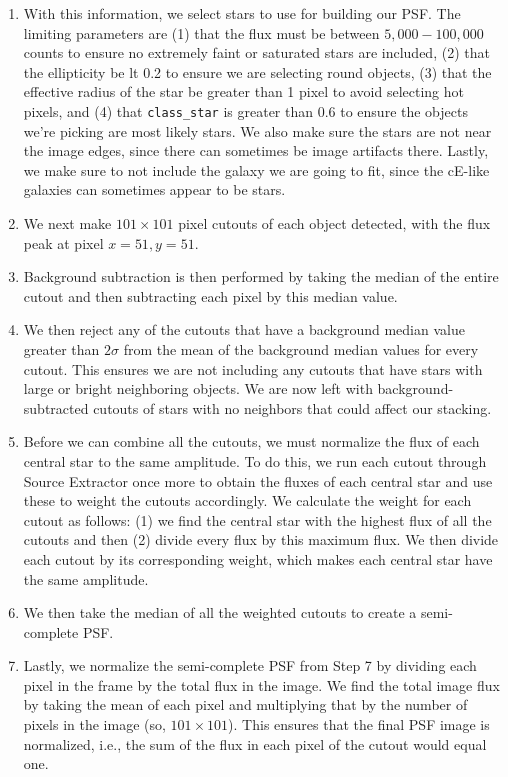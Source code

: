 \documentclass[iop,apj]{emulateapj}
\begin{document}
\begin{description}
{\begin{enumerate}
\item With this information, we select stars to use for building our PSF. The limiting parameters are (1) that the flux must be between $5,000-100,000$ counts to ensure no extremely faint or saturated stars are included, (2) that the ellipticity be lt 0.2 to ensure we are selecting round objects, (3) that the effective radius of the star be greater than 1 pixel to avoid selecting hot pixels, and (4) that \texttt{class\_star} is greater than 0.6 to ensure the objects we're picking are most likely stars. We also make sure the stars are not near the image edges, since there can sometimes be image artifacts there. Lastly, we make sure to not include the galaxy we are going to fit, since the cE-like galaxies can sometimes appear to be stars.

\item We next make $101\times101$ pixel cutouts of each object detected, with the flux peak at pixel $x=51,y=51$. 

\item Background subtraction is then performed by taking the median of the entire cutout and then subtracting each pixel by this median value.

\item We then reject any of the cutouts that have a background median value greater than $2\sigma$ from the mean of the background median values for every cutout. This ensures we are not including any cutouts that have stars with large or bright neighboring objects. We are now left with background-subtracted cutouts of stars with no neighbors that could affect our stacking. 

\item Before we can combine all the cutouts, we must normalize the flux of each central star to the same amplitude. To do this, we run each cutout through Source Extractor once more to obtain the fluxes of each central star and use these to weight the cutouts accordingly. We calculate the weight for each cutout as follows: (1) we find the central star with the highest flux of all the cutouts and then (2) divide every flux by this maximum flux. We then divide each cutout by its corresponding weight, which makes each central star have the same amplitude.

\item We then take the median of all the weighted cutouts to create a semi-complete PSF.

\item Lastly, we normalize the semi-complete PSF from Step 7 by dividing each pixel in the frame by the total flux in the image. We find the total image flux by taking the mean of each pixel and multiplying that by the number of pixels in the image (so, $101\times101$). This ensures that the final PSF image is normalized, i.e., the sum of the flux in each pixel of the cutout would equal one.    


\end{enumerate}}
\end{description}
\end{document}
